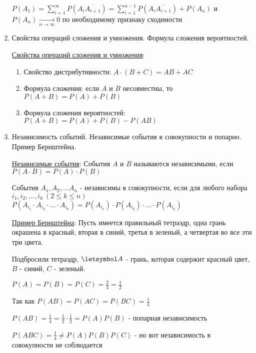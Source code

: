 \begin{enumerate}
\begin{MyProof}
        $P(A_1) = \sum_{i = 1}^\infty P(A_i \overline{A_{i + 1}}) = \sum_{i = 1}^{n - 1} P(A_i \overline{A_{i + 1}}) + P(A_n)$ и $P(A_n) \underset{n \to \infty}{\to} 0$ по необходимому признаку сходимости
    \end{MyProof}

    \item Свойства операций сложения и умножения. Формула сложения вероятностей.

    \hyperlink{probabilityoperationsproperties}{Свойства операций сложения и умножения}:

    \begin{enumerate}
        \item Свойство дистрибутивности: $A \cdot (B + C) = AB + AC$

        \item Формула сложения: если $A$ и $B$ несовместны, то $P(A + B) = P(A) + P(B)$

        \item Формула сложения вероятностей: $P(A + B) = P(A) + P(B) - P(AB)$
    \end{enumerate}

    \item Независимость событий. Независимые события в совокупности и попарно. Пример Бернштейна. 

    \hyperlink{independantevents}{Независимые события}: События $A$ и $B$ называются независимыми, если $P(A \cdot B) = P(A) \cdot P(B)$

    События $A_1, A_2, \dots A_n$ - независимы в совокупности, если для любого набора $i_1, i_2, \dots, i_k \ (2 \leq k \leq n)$
    $P(A_{i_1} \cdot A_{i_2} \cdot \dots \cdot A_{i_k}) = P(A_{i_1}) \cdot P(A_{i_2}) \cdot \dots \cdot P(A_{i_k})$

    \hyperlink{bernshteinsexample}{Пример Бернштейна}: Пусть имеется правильный тетраэдр, одна грань окрашена в красный, вторая в синий, третья в зеленый, а четвертая во все эти три цвета.

    Подбросили тетраэдр, $\letsymbol A$ - грань, которая содержит красный цвет, $B$ - синий, $C$ - зеленый.

    $P(A) = P(B) = P(C) = \frac{2}{4} = \frac{1}{2}$

    Так как $P(AB) = P(AC) = P(BC) = \frac{1}{4}$

    $P(AB) = \frac{1}{4} = \frac{1}{2} \cdot \frac{1}{2} = P(A) P(B)$ - попарная независимость

    $P(ABC) = \frac{1}{4} \neq P(A) P(B) P(C)$ - но вот независимость в совокупности не соблюдается


\end{enumerate}

